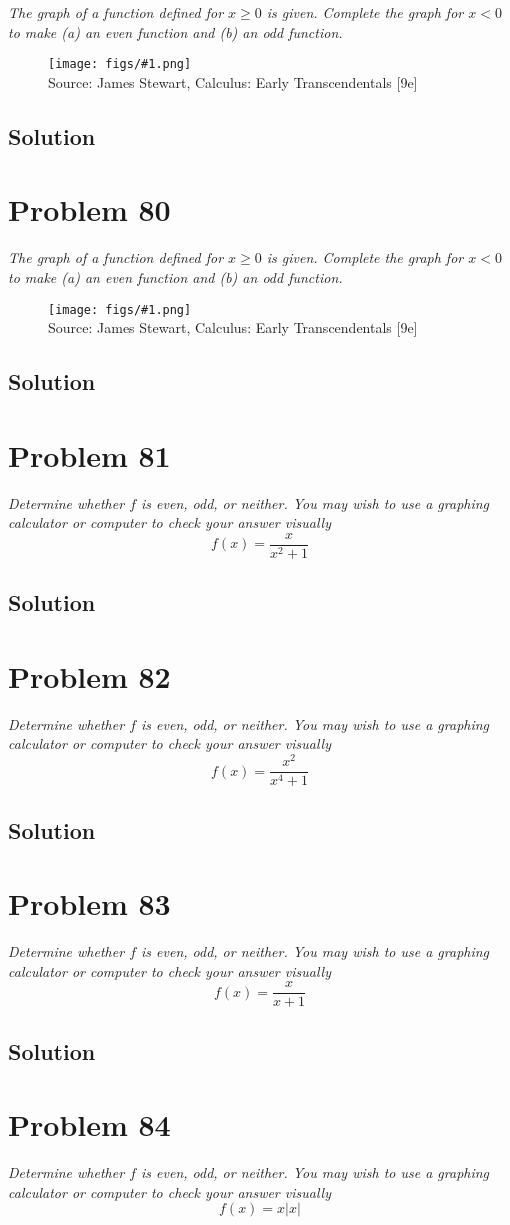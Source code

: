 \documentclass[11pt]{article}
\newcommand{\soln}{\subsection*}
\newcommand{\qn}{\textit}
\newcommand{\imagesource}[1]{{\footnotesize Source: #1}}
\newcommand{\imgqn}[1]{
	\begin{figure}[H]
		\centering
		\texttt{[image: figs/\#1.png]}\\
		\imagesource{James Stewart, Calculus: Early Transcendentals [9e]}
	\end{figure}
}
\begin{document}
\qn{The graph of a function defined for $x \ge 0$ is given. Complete the graph for $x<0$ to make (a) an even function and (b) an odd function.}

\imgqn{1.1.79}

\soln{Solution}

\section*{Problem 80}

\qn{The graph of a function defined for $x \ge 0$ is given. Complete the graph for $x<0$ to make (a) an even function and (b) an odd function.}

\imgqn{1.1.80}

\soln{Solution}

\section*{Problem 81}

\qn{Determine whether $f$ is even, odd, or neither. You may wish to use a graphing calculator or computer to check your answer visually $$f(x)=\frac{x}{x^2+1}$$}

\soln{Solution}

\section*{Problem 82}

\qn{Determine whether $f$ is even, odd, or neither. You may wish to use a graphing calculator or computer to check your answer visually $$f(x)=\frac{x^2}{x^4+1}$$}

\soln{Solution}

\section*{Problem 83}

\qn{Determine whether $f$ is even, odd, or neither. You may wish to use a graphing calculator or computer to check your answer visually $$f(x)=\frac{x}{x+1}$$}

\soln{Solution}

\section*{Problem 84}

\qn{Determine whether $f$ is even, odd, or neither. You may wish to use a graphing calculator or computer to check your answer visually $$f(x)=x|x|$$}
\end{document}
